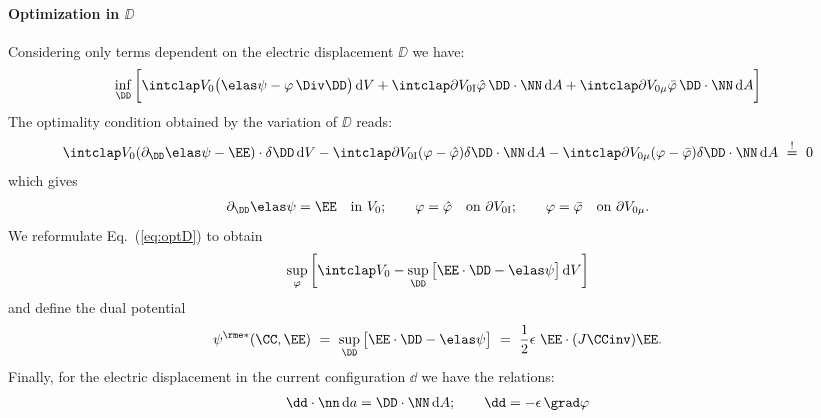 \paragraph{Optimization in $\DD$} \label{sec:optD} %
  Considering only terms dependent on the electric displacement $\DD$ we have:
  \begin{align}
    \inf_\DD \bigg[ \intVO \big( \psie - \varphi \,\Div \DD \big) \dV 
    + \intdVOx{I} \hat\varphi \, \DD\cdot\NN\dA 
    + \intdVOx{\mu} \bar\varphi\,\DD\cdot\NN \dA \bigg]
    \label{eq:optD}
  \end{align}
  The optimality condition obtained by the variation of $\DD$ reads:
  \begin{align}
    \intVO (\dDD\psie-\EE) \cdot \delta\DD \dV - \intdVOx{I} (\varphi-\hat\varphi) \delta\DD\cdot\NN\dA - \intdVOx{\mu} (\varphi-\bar\varphi)\delta\DD\cdot\NN\dA  \ \stackrel{!}{=} \ 0
  \end{align}
  which gives
  \begin{align}
    \dDD\psie=\EE \quad \text{in} \ V_0; \qquad \varphi=\hat\varphi \quad \text{on} \ \partial V_{0\rm I}; \qquad \varphi=\bar\varphi \quad \text{on} \ \partial V_{0\mu}.
  \end{align}
  We reformulate Eq.~(\ref{eq:optD}) to obtain
  \begin{align}
    \sup_{\varphi}\bigg[ \intVO -\sup_\DD \big[ \EE\cdot\DD - \psie \big]\dV \bigg]
  \end{align}
  and define the dual potential
  \begin{align}
    \psies(\CC,\EE) \ = \ \sup_{\DD} \big[ \EE\cdot\DD - \psie \big] \ = \ \frac{1}{2}\epsilon \ \EE \cdot (J\CCinv)\EE.
  \end{align}
  Finally, for the electric displacement in the current configuration $\dd$ we have the relations:
  \begin{align}
    \dd \cdot \nn\,\rmd a = \DD\cdot\NN\dA; \qquad \dd = -\epsilon\,\grad\varphi 
  \end{align}

